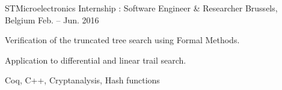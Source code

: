 \begin{cventries}

	\cventrysix%
	{STMicroelectronics} %
	{Internship : Software Engineer \& Researcher} %
	{Brussels, Belgium} %
	{Feb. -- Jun. 2016} %
	{
		\begin{cvitems} %
			\item {Verification of the truncated tree search using Formal Methods.} %
			\item {Application to differential and linear trail search.} %
		\end{cvitems}
	}%
	{Coq, C++, Cryptanalysis, Hash functions}%





\end{cventries}
